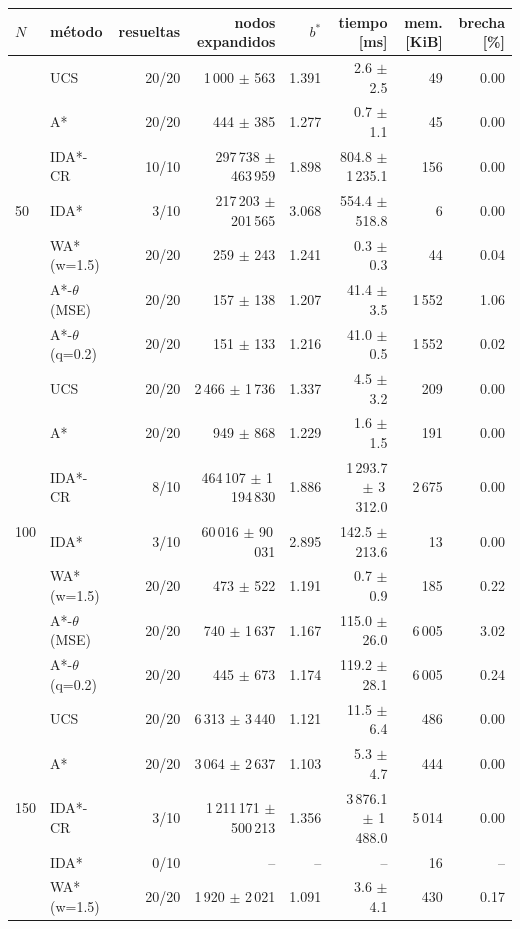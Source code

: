 \begin{tabular}{llrrrrrr}
\toprule
$N$ & método & resueltas & nodos expandidos & $b^*$ & tiempo [ms] & mem. [KiB] & brecha [\%] \\
\midrule
\multirow{7}{*}{50} & UCS & 20/20 & 1\,000 $\pm$ 563 & 1.391 & 2.6 $\pm$ 2.5 & 49 & 0.00 \\
 & A* & 20/20 & 444 $\pm$ 385 & 1.277 & 0.7 $\pm$ 1.1 & 45 & 0.00 \\
 & IDA*-CR & 10/10 & 297\,738 $\pm$ 463\,959 & 1.898 & 804.8 $\pm$ 1\,235.1 & 156 & 0.00 \\
 & IDA* & 3/10 & 217\,203 $\pm$ 201\,565 & 3.068 & 554.4 $\pm$ 518.8 & 6 & 0.00 \\
 & WA* (w=1.5) & 20/20 & 259 $\pm$ 243 & 1.241 & 0.3 $\pm$ 0.3 & 44 & 0.04 \\
 & A*-$\theta$ (MSE) & 20/20 & 157 $\pm$ 138 & 1.207 & 41.4 $\pm$ 3.5 & 1\,552 & 1.06 \\
 & A*-$\theta$ (q=0.2) & 20/20 & 151 $\pm$ 133 & 1.216 & 41.0 $\pm$ 0.5 & 1\,552 & 0.02 \\
\midrule
\multirow{7}{*}{100} & UCS & 20/20 & 2\,466 $\pm$ 1\,736 & 1.337 & 4.5 $\pm$ 3.2 & 209 & 0.00 \\
 & A* & 20/20 & 949 $\pm$ 868 & 1.229 & 1.6 $\pm$ 1.5 & 191 & 0.00 \\
 & IDA*-CR & 8/10 & 464\,107 $\pm$ 1\,194\,830 & 1.886 & 1\,293.7 $\pm$ 3\,312.0 & 2\,675 & 0.00 \\
 & IDA* & 3/10 & 60\,016 $\pm$ 90\,031 & 2.895 & 142.5 $\pm$ 213.6 & 13 & 0.00 \\
 & WA* (w=1.5) & 20/20 & 473 $\pm$ 522 & 1.191 & 0.7 $\pm$ 0.9 & 185 & 0.22 \\
 & A*-$\theta$ (MSE) & 20/20 & 740 $\pm$ 1\,637 & 1.167 & 115.0 $\pm$ 26.0 & 6\,005 & 3.02 \\
 & A*-$\theta$ (q=0.2) & 20/20 & 445 $\pm$ 673 & 1.174 & 119.2 $\pm$ 28.1 & 6\,005 & 0.24 \\
\midrule
\multirow{7}{*}{150} & UCS & 20/20 & 6\,313 $\pm$ 3\,440 & 1.121 & 11.5 $\pm$ 6.4 & 486 & 0.00 \\
 & A* & 20/20 & 3\,064 $\pm$ 2\,637 & 1.103 & 5.3 $\pm$ 4.7 & 444 & 0.00 \\
 & IDA*-CR & 3/10 & 1\,211\,171 $\pm$ 500\,213 & 1.356 & 3\,876.1 $\pm$ 1\,488.0 & 5\,014 & 0.00 \\
 & IDA* & 0/10 & -- & -- & -- & 16 & -- \\
 & WA* (w=1.5) & 20/20 & 1\,920 $\pm$ 2\,021 & 1.091 & 3.6 $\pm$ 4.1 & 430 & 0.17 \\

\end{tabular}
